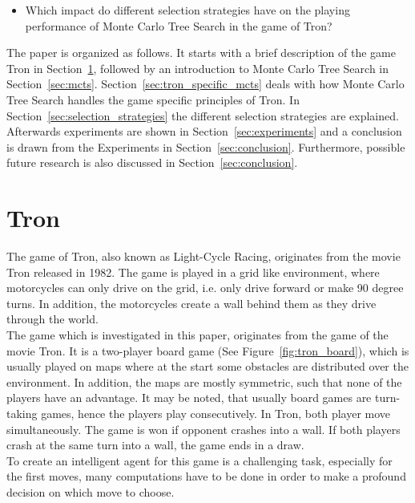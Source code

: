 \documentclass{article}
\begin{document}
\begin{itemize}
	\item Which impact do different selection strategies have on the playing performance of Monte Carlo Tree Search in the game of Tron?
\end{itemize}

The paper is organized as follows. It starts with a brief description of the game Tron in Section~\ref{sec:tron}, followed by an introduction to Monte Carlo Tree Search in Section~\ref{sec:mcts}. Section~\ref{sec:tron_specific_mcts} deals with how Monte Carlo Tree Search handles the game specific principles of Tron. In Section~\ref{sec:selection_strategies} the different selection strategies are explained. Afterwards experiments are shown in Section~\ref{sec:experiments} and a conclusion is drawn from the Experiments in Section~\ref{sec:conclusion}. Furthermore, possible future research is also discussed in Section~\ref{sec:conclusion}.

\section{Tron}
\label{sec:tron}
The game of Tron, also known as Light-Cycle Racing, originates from the movie Tron released in 1982. The game is played in a grid like environment, where motorcycles can only drive on the grid, i.e. only drive forward or make 90 degree turns. In addition, the motorcycles create a wall behind them as they drive through the world.\\
The game which is investigated in this paper, originates from the game of the movie Tron. It is a two-player board game (See Figure~\ref{fig:tron_board}), which is usually played on maps where at the start some obstacles are distributed over the environment. In addition, the maps are mostly symmetric, such that none of the players have an advantage. It may be noted, that usually board games are turn-taking games, hence the players play consecutively. In Tron, both player move simultaneously. The game is won if opponent crashes into a wall. If both players crash at the same turn into a wall, the game ends in a draw.\\
To create an intelligent agent for this game is a challenging task, especially for the first moves, many computations have to be done in order to make a profound decision on which move to choose.
\end{document}
